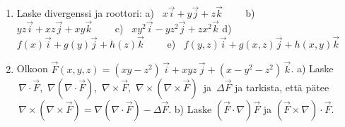 \Harj
\begin{enumerate}

\item
Laske divergenssi ja roottori: \vspace{2mm}\newline
a) \ $x\vec i+y\vec j+z\vec k \qquad$
b) \ $yz\vec i+xz\vec j+xy\vec k \qquad$
c) \ $xy^2\vec i-yz^2\vec j+zx^2\vec k$ \vspace{1mm}\newline
d) \ $f(x)\vec i+g(y)\vec j+h(z)\vec k \qquad$
e) \ $f(y,z)\vec i+g(x,z)\vec j+h(x,y)\vec k$
 
\item 
Olkoon
$\vec F(x,y,z)=(x y-z^2)\,\vec i + x y z \,\vec j + (x-y^2-z^2)\,\vec k$. \vspace{1mm}\newline
a) Laske $\,\nabla\cdot\vec F$, $\,\nabla(\nabla\cdot\vec F)$, $\,\nabla\times\vec F$, 
$\,\nabla\times(\nabla\times\vec F)\,$ ja $\,\Delta \vec F$ ja tarkista, että pätee
$\,\nabla\times(\nabla\times\vec F) 
            = \nabla(\nabla\cdot\vec F)-\Delta\vec F$. \vspace{1mm}\newline
b) Laske $(\vec F\cdot\nabla)\vec F$ ja $(\vec F\times\nabla)\cdot\vec F$.


\end{enumerate}
